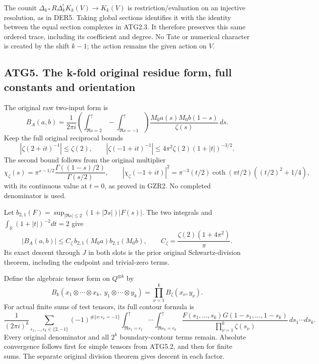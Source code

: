 The counit \(\Delta_{k*}R\Delta_k^!K_k(V)\to K_k(V)\) is
restriction/evaluation on an injective resolution, as in DER5. Taking
global sections identifies it with the identity between the equal
section complexes in ATG2.3. It therefore preserves this same ordered
trace, including its coefficient and degree. No Tate or numerical
character is created by the shift \(k-1\); the action remains the given
action on \(V\).

\subsection{ATG5. The k-fold original residue form, full constants and
orientation}\label{atg5.-the-k-fold-original-residue-form-full-constants-and-orientation}

The original raw two-input form is \[
B_A(a,b)=\frac1{2\pi i}
\left(\int_{\Re s=2}^{\uparrow}-\int_{\Re s=-1}^{\uparrow}\right)
\frac{M_0a(s)M_0b(1-s)}{\zeta(s)}\,ds.
\] Keep the full original reciprocal bounds \[
|\zeta(2+it)^{-1}|\le\zeta(2),\qquad
|\zeta(-1+it)^{-1}|\le
4\pi^2\zeta(2)(1+|t|)^{-3/2}.
\tag{ATG5.1}
\] The second bound follows from the original multiplier \[
\chi_\zeta(s)=\pi^{s-1/2}\frac{\Gamma((1-s)/2)}{\Gamma(s/2)},\qquad
|\chi_\zeta(-1+it)|^2=
\pi^{-3}(t/2)\coth(\pi t/2)((t/2)^2+1/4),
\] with its continuous value at \(t=0\), as proved in GZR2. No completed
denominator is used.

Let \(b_{2,1}(F)=\sup_{|\Re s|\le2}(1+|\Im s|)|F(s)|\). The two
integrals and \(\int_{\mathbb R}(1+|t|)^{-2}dt=2\) give \[
|B_A(a,b)|\le C_\zeta\,b_{2,1}(M_0a)b_{2,1}(M_0b),
\qquad C_\zeta=\frac{\zeta(2)(1+4\pi^2)}{\pi}.
\tag{ATG5.2}
\] Its exact descent through \(J\) in both slots is the prior original
Schwartz-division theorem, including the endpoint and trivial-zero
terms.

Define the algebraic tensor form on \(Q^{\otimes k}\) by \[
B_k(x_1\otimes\cdots\otimes x_k,\ y_1\otimes\cdots\otimes y_k)
=\prod_{\nu=1}^k B_\zeta(x_\nu,y_\nu).
\tag{ATG5.3}
\] For actual finite sums of test tensors, its full contour formula is
\[
\frac1{(2\pi i)^k}
\sum_{\epsilon_1,\ldots,\epsilon_k\in\{2,-1\}}
(-1)^{\#\{\nu:\epsilon_\nu=-1\}}
\int_{\Re s_1=\epsilon_1}^{\uparrow}\cdots
\int_{\Re s_k=\epsilon_k}^{\uparrow}
\frac{F(s_1,\ldots,s_k)G(1-s_1,\ldots,1-s_k)}
{\prod_{\nu=1}^k\zeta(s_\nu)}\,ds_1\cdots ds_k.
\tag{ATG5.4}
\] Every original denominator and all \(2^k\) boundary-contour terms
remain. Absolute convergence follows first for simple tensors from
ATG5.2, and then for finite sums. The separate original division theorem
gives descent in each factor.

